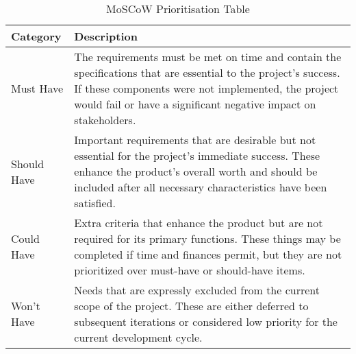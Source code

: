 \begin{table}
\centering
\begin{tabular}{|p{3cm}|p{11cm}|}
\hline
\textbf{Category} & \textbf{Description} \\
\hline
Must Have & The requirements must be met on time and contain the specifications that are essential to the project's success.  If these components were not implemented, the project would fail or have a significant negative impact on stakeholders.  \\

\hline
Should Have & Important requirements that are desirable but not essential for the project's immediate success.  These enhance the product's overall worth and should be included after all necessary characteristics have been satisfied. \\

\hline
Could Have & Extra criteria that enhance the product but are not required for its primary functions. These things may be completed if time and finances permit, but they are not prioritized over must-have or should-have items.  \\


\hline
Won't Have & Needs that are expressly excluded from the current scope of the project. These are either deferred to subsequent iterations or considered low priority for the current development cycle.\\
\hline
\end{tabular}
\caption{MoSCoW Prioritisation Table}
\label{tab:user-stories-table}
\end{table}




